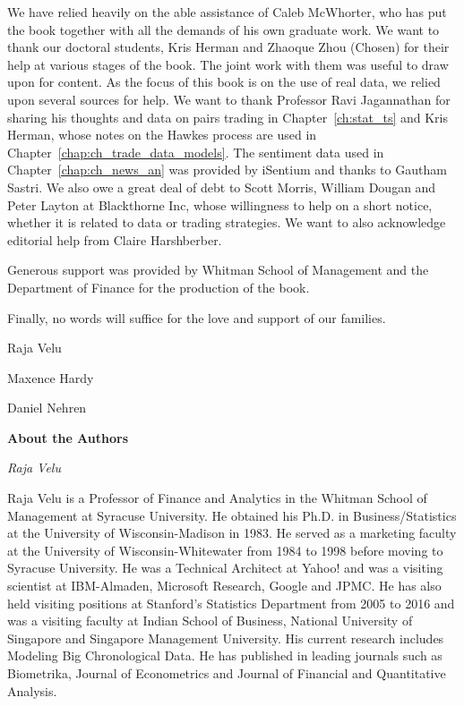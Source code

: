 We have relied heavily on the able assistance of Caleb McWhorter, who has put the book together with all the demands of his own graduate work. We want to thank our doctoral students, Kris Herman and Zhaoque Zhou (Chosen) for their help at various stages of the book. The joint work with them was useful to draw upon for content. As the focus of this book is on the use of real data, we relied upon several sources for help. We want to thank Professor Ravi Jagannathan for sharing his thoughts and data on pairs trading in Chapter~\ref{ch:stat_ts} and Kris Herman, whose notes on the Hawkes process are used in Chapter~\ref{chap:ch_trade_data_models}. The sentiment data used in Chapter~\ref{chap:ch_news_an} was provided by iSentium and thanks to Gautham Sastri. We also owe a great deal of debt to Scott Morris, William Dougan and Peter Layton at Blackthorne Inc, whose willingness to help on a short notice, whether it is related to data or trading strategies. We want to also acknowledge editorial help from Claire Harshberber. 


Generous support was provided by Whitman School of Management and the Department of Finance for the production of the book. 


Finally, no words will suffice for the love and support of our families. \vspace{3\baselineskip}


\noindent Raja Velu \par
\noindent Maxence Hardy \par
\noindent Daniel Nehren



\newpage



{\noindent\Large\bfseries About the Authors} \vspace{1cm}


{\noindent\large\itshape Raja Velu} \medskip

\noindent Raja Velu is a Professor of Finance and Analytics in the Whitman School of Management at Syracuse University. He obtained his Ph.D. in Business/Statistics at the University of Wisconsin-Madison in 1983. He served as a marketing faculty at the University of Wisconsin-Whitewater from 1984 to 1998 before moving to Syracuse University. He was a Technical Architect at Yahoo! and was a visiting scientist at IBM-Almaden, Microsoft Research, Google and JPMC. He has also held visiting positions at Stanford's Statistics Department from 2005 to 2016 and was a visiting faculty at Indian School of Business, National University of Singapore and Singapore Management University. His current research includes Modeling Big Chronological Data. He has published in leading journals such as Biometrika, Journal of Econometrics and Journal of Financial and Quantitative Analysis. \bigskip


